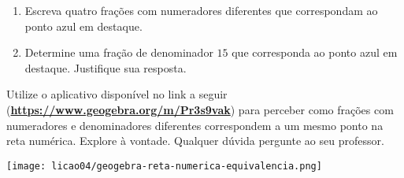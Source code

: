 \begin{atividade}{}
\begin{enumerate}
\begin{center}
{
  }
\end{center}
  \item     Escreva quatro frações com numeradores diferentes que correspondam ao ponto azul em destaque.
  \item     Determine uma fração de denominador     $15$ que corresponda ao ponto azul em destaque. Justifique sua resposta.
\end{enumerate} %
\end{atividade}

\begin{refletindo*}{}
Utilize o aplicativo disponível no link a seguir (\textbf{\url{https://www.geogebra.org/m/Pr3s9vak}}) para perceber como frações com numeradores e denominadores diferentes correspondem a um mesmo ponto na reta numérica. Explore à vontade. Qualquer dúvida pergunte ao seu professor.
\begin{center}
\texttt{[image: licao04/geogebra-reta-numerica-equivalencia.png]}
\end{center}

\end{refletindo*}

